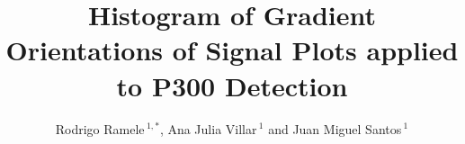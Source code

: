 \documentclass[utf8]{frontiersSCNS} %
\def\firstAuthorLast{Ramele {et~al.}} %
\def\Authors{Rodrigo Ramele\,$^{1,*}$, Ana Julia Villar\,$^{1}$ and Juan Miguel Santos\,$^{1}$}
\begin{document}
\onecolumn
{}

\title[Histogram of Gradient Orientations of Signal Plots]{Histogram of Gradient Orientations of Signal Plots applied to P300 Detection} 

\author[\firstAuthorLast ]{\Authors} %
\address{} %
\correspondance{} %

\extraAuth{}%


\maketitle
\end{document}
